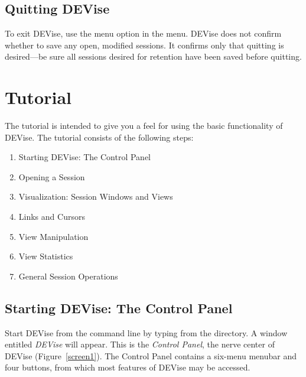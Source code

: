 \subsection{Quitting DEVise}

To exit DEVise, use the  menu option in the  menu.
DEVise does not confirm whether to save any open, modified sessions. It confirms
only that quitting is desired---be sure all sessions desired for retention have
been saved before quitting.


\section{Tutorial}

The tutorial is intended to give you a feel for using the basic functionality of
DEVise. The tutorial consists of the following steps:

\begin{enumerate}
	\item Starting DEVise: The Control Panel
	\item Opening a Session
	\item Visualization: Session Windows and Views
	\item Links and Cursors
	\item View Manipulation
	\item View Statistics
	\item General Session Operations
\end{enumerate}


\subsection{Starting DEVise: The Control Panel}

Start DEVise from the command line by typing  from the
 directory. A window entitled {\em DEVise} will appear. This is
the {\em Control Panel}, the nerve center of DEVise (Figure~\ref{screen1}). The
Control Panel contains a six-menu menubar and four buttons, from which most
features of DEVise may be accessed.


